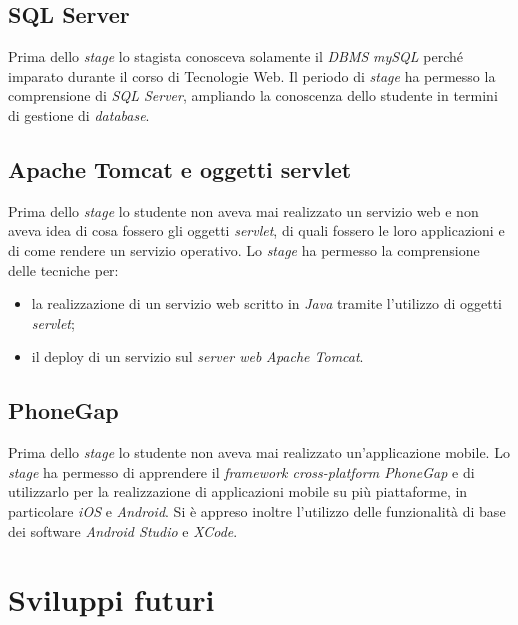 \subsection{SQL Server}

Prima dello \textit{stage} lo stagista conosceva solamente il \textit{DBMS} \textit{mySQL} perché imparato durante il corso di Tecnologie Web. Il periodo di \textit{stage} ha permesso la comprensione di \textit{SQL Server}, ampliando la conoscenza dello studente in termini di gestione di \textit{database}.

\subsection{Apache Tomcat e oggetti servlet}

Prima dello \textit{stage} lo studente non aveva mai realizzato un servizio web e non aveva idea di cosa fossero gli oggetti \textit{servlet}, di quali fossero le loro applicazioni e di come rendere un servizio operativo. Lo \textit{stage} ha permesso la comprensione delle tecniche per:
\begin{itemize}
	\item la realizzazione di un servizio web scritto in \textit{Java} tramite l'utilizzo di oggetti \textit{servlet};
	\item il deploy di un servizio sul \textit{server web} \textit{Apache Tomcat}.
\end{itemize}

\subsection{PhoneGap}

Prima dello \textit{stage} lo studente non aveva mai realizzato un'applicazione mobile. Lo \textit{stage} ha permesso di apprendere il \textit{framework cross-platform PhoneGap} e di utilizzarlo per la realizzazione di applicazioni mobile su più piattaforme, in particolare \textit{iOS} e \textit{Android}. Si è appreso inoltre l'utilizzo delle funzionalità di base dei software \textit{Android Studio} e \textit{XCode}.

\section{Sviluppi futuri}

